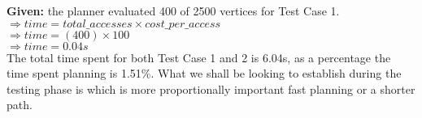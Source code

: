 \noindent
\textbf{Given:} the planner evaluated 400 of 2500 vertices for Test Case 1. \\

\indent $\Rightarrow time = total\_accesses \times cost\_per\_access$ \\
\indent $\Rightarrow time = (400) \times 100$ \\
\indent $\Rightarrow time = 0.04s$ \\

\noindent
The total time spent for both Test Case 1 and 2 is 6.04s, as a percentage the time spent planning is 1.51\%.  What we shall be looking to establish during the testing phase is which is more proportionally important fast planning or a shorter path.